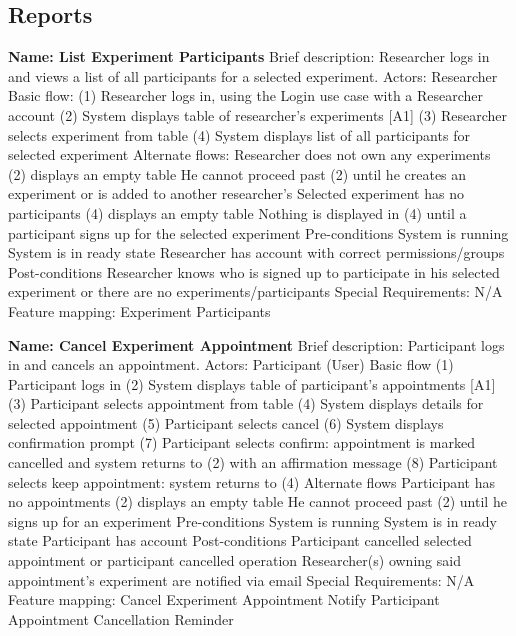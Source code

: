 \subsection{Reports}
\begin{outline}[enumerate]

\1 {\bf Name: List Experiment Participants}
\2 Brief description: Researcher logs in and views a list of all participants for a selected experiment.
\2 Actors: Researcher
\2 Basic flow:
\3 (1) Researcher logs in, using the Login use case with a Researcher account
\3 (2) System displays table of researcher's experiments [A1]
\3 (3) Researcher selects experiment from table
\3 (4) System displays list of all participants for selected experiment
\2 Alternate flows:
\3 [A1] Researcher does not own any experiments
\4 (2) displays an empty table
\4 He cannot proceed past (2) until he creates an experiment or is added to another researcher's
\3 Selected experiment has no participants
\4 (4) displays an empty table
\4 Nothing is displayed in (4) until a participant signs up for the selected experiment
\2 Pre-conditions
\3 System is running
\3 System is in ready state
\3 Researcher has account with correct permissions/groups
\2 Post-conditions
\3 Researcher knows who is signed up to participate in his selected experiment or there are no experiments/participants
\2 Special Requirements:
\3 N/A
\2 Feature mapping:
\3 Experiment Participants

\1 {\bf Name: Cancel Experiment Appointment}
\2 Brief description: Participant logs in and cancels an appointment.
\2 Actors: Participant (User)
\2 Basic flow
\3 (1) Participant logs in
\3 (2) System displays table of participant's appointments [A1]
\3 (3) Participant selects appointment from table
\3 (4) System displays details for selected appointment
\3 (5) Participant selects cancel
\3 (6) System displays confirmation prompt
\3 (7) Participant selects confirm: appointment is marked cancelled and system returns to (2) with an affirmation message
\3 (8) Participant selects keep appointment: system returns to (4)
\2 Alternate flows
\3 [A1] Participant has no appointments
\4 (2) displays an empty table
\4 He cannot proceed past (2) until he signs up for an experiment
\2 Pre-conditions
\3 System is running
\3 System is in ready state
\3 Participant has account
\2 Post-conditions
\3 Participant cancelled selected appointment or participant cancelled operation
\3 Researcher(s) owning said appointment's experiment are notified via email
\2 Special Requirements:
\3 N/A
\2 Feature mapping:
\3 Cancel Experiment Appointment
\3 Notify Participant Appointment Cancellation Reminder


\end{outline}
